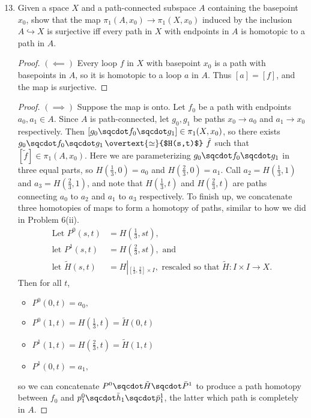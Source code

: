 \documentclass[12pt,letterpaper]{article}
\begin{document}
\begin{enumerate}
\setcounter{enumi}{12}
\item Given a space $X$ and a path-connected subspace $A$ containing the basepoint $x_0$, show that the map $\pi_1(A,x_0)\to \pi_1(X,x_0)$ induced by the inclusion $A\hookrightarrow X$ is surjective iff every path in $X$ with endpoints in $A$ is homotopic to a path in $A$. 
\begin{proof}$(\impliedby)$
Every loop $f$ in $X$ with basepoint $x_0$ is a path with basepoints in $A$, so it is homotopic to a loop $a$ in $A$. Thus $[a]=[f]$, and the map is surjective. 
\end{proof}
\begin{proof}$(\implies)$
 Suppose the map is onto. Let $f_0$ be a path with endpoints $a_0,a_1\in A$. Since $A$ is path-connected, let $g_0, g_1$ be paths $x_0\to a_0$ and $a_1\to x_0$ respectively. Then $[g_0\sqcdot f_0 \sqcdot g_1]\in \pi_1(X,x_0)$, so there exists 
 $g_0\sqcdot f_0 \sqcdot g_1 \,\overtext{\simeq}{$H(s,t)$}\,\, \tilde{f}$
 such that $[\tilde{f}]\in \pi_1(A,x_0)$. Here we are parameterizing $g_0\sqcdot f_0 \sqcdot g_1$ in three equal parts, so $H(\frac{1}{3},0)=a_0$ and $H(\frac{2}{3},0)=a_1$.  Call $a_2=H(\frac{1}{3},1)$ and $a_3=H(\frac{2}{3},1)$, and note that $H(\frac{1}{3},t)$ and $H(\frac{2}{3},t)$ are paths connecting $a_0$ to $a_2$ and $a_1$ to $a_3$ respectively. 
 To finish up, we concatenate three homotopies of maps to form a homotopy of paths, similar to how we did in Problem 6(ii). 
\begin{align*}
 \text{Let }P^0(s,t)&=H\left(\tfrac{1}{3},st\right), \\
 \text{let }P^1(s,t)&=H\left(\tfrac{2}{3},st\right),\text{ and }\\
 \text{let }\tilde{H}(s,t)&=H\left|_{\left[\frac{1}{3},\frac{2}{3}\right]\times I}\right., \text{ rescaled so that }\tilde{H}:I\times I\to X. 
\end{align*}
Then for all $t$,  
\begin{itemize}
\item $P^0(0,t)=a_0,$
\item $P^0(1,t)=H\left(\tfrac{1}{3},t\right)=\tilde{H}(0,t) $
\item $P^1(1,t)=H\left(\tfrac{2}{3},t\right)=\tilde{H}(1,t) $
\item $P^1(0,t)=a_1,$
\end{itemize}
so we can concatenate $P^0\sqcdot \tilde{H} \sqcdot \bar{P}^1$ to produce a path homotopy between $f_0$ and $p^0_1\sqcdot \tilde{h}_1 \sqcdot \bar{p}^1_1$, the latter which path is completely in $A$. 
\end{proof}



\end{enumerate}
\vfill
\end{document}
